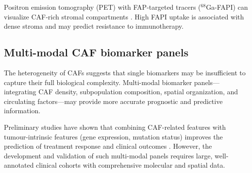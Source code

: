 Positron emission tomography (PET) with FAP-targeted tracers ($^{68}$Ga-FAPI) can visualize CAF-rich stromal compartments \citep{kratochwil2019}. High FAPI uptake is associated with dense stroma and may predict resistance to immunotherapy.

\subsection{Multi-modal CAF biomarker panels}

The heterogeneity of CAFs suggests that single biomarkers may be insufficient to capture their full biological complexity. Multi-modal biomarker panels---integrating CAF density, subpopulation composition, spatial organization, and circulating factors---may provide more accurate prognostic and predictive information.

Preliminary studies have shown that combining CAF-related features with tumour-intrinsic features (gene expression, mutation status) improves the prediction of treatment response and clinical outcomes \citep{seth2021}. However, the development and validation of such multi-modal panels requires large, well-annotated clinical cohorts with comprehensive molecular and spatial data.
